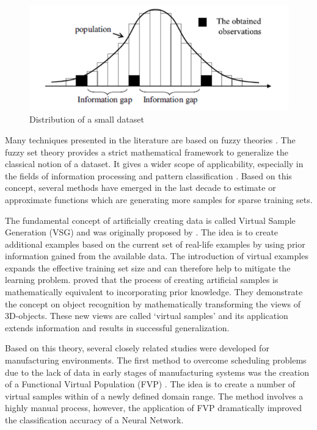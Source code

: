 \documentclass[parskip=full]{scrartcl}
\begin{document}
\begin{figure}[H]
	\centering
	\includegraphics[width=0.6\linewidth]{"./Resources/small_data_distribution"}
	\caption{Distribution of a small dataset}
	\label{fig:small-data-distribution}
\end{figure}

Many techniques presented in the literature are based on fuzzy theories
\cite{AbdulLateh.2017}. The fuzzy set theory provides a strict mathematical
framework to generalize the classical notion of a dataset. It gives a wider
scope of applicability, especially in the fields of information processing and
pattern classification \cite{Zimmermann.2010}. Based on this concept, several
methods have emerged in the last decade to estimate or approximate functions
which are generating more samples for sparse training sets.

The fundamental concept of artificially creating data is called Virtual Sample 
Generation (VSG) and was originally proposed by \cite{Niyogi.1998}. The idea is 
to create additional examples based on the current set of real-life examples by 
using prior information gained from the available data. The introduction of 
virtual examples expands the effective training set size and can therefore help 
to mitigate the learning problem. \cite{Niyogi.1998} proved that the process of 
creating artificial samples is mathematically equivalent to incorporating prior 
knowledge. They demonstrate the concept on object recognition by mathematically 
transforming the views of 3D-objects. These new views are called ‘virtual 
samples’ and its application extends information and results in successful 
generalization. 

Based on this theory, several closely related studies were developed for
manufacturing environments. The first method to overcome scheduling problems due
to the lack of data in early stages of manufacturing systems was the creation of
a Functional Virtual Population (FVP) \cite{Li.2003}. The idea is to
create a number of virtual samples within of a newly defined domain range. The
method involves a highly manual process, however, the application of FVP
dramatically improved the classification accuracy of a Neural Network. 
\end{document}
